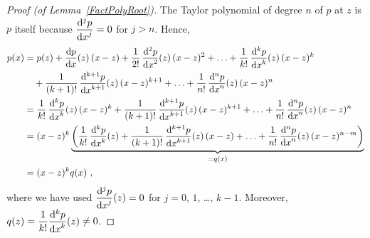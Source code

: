 \begin{proof}[Proof (of Lemma~\ref{FactPolyRoot})]
The Taylor polynomial of degree $n$ of $p$ at $z$ is $p$ itself
because $\DS \dydxn{p}{x}{j} = 0$ for $j>n$.  Hence,
\begin{align*}
p(x) &= p(z) + \dydx{p}{x}(z)\,(x-z) +
\frac{1}{2!}\,\dydxn{p}{x}{2}(z)\,(x-z)^2
+ \ldots + \frac{1}{k!}\,\dydxn{p}{x}{k}(z)\,(x-z)^k \\
&\quad + \frac{1}{(k+1)!}\,\dydxn{p}{x}{k+1}(z)\,(x-z)^{k+1}
+ \ldots + \frac{1}{n!}\,\dydxn{p}{x}{n}(z)\,(x-z)^n \\
&= \frac{1}{k!}\,\dydxn{p}{x}{k}(z)\,(x-z)^k
+ \frac{1}{(k+1)!}\,\dydxn{p}{x}{k+1}(z)\,(x-z)^{k+1}
+ \ldots + \frac{1}{n!}\,\dydxn{p}{x}{n}(z)\,(x-z)^n \\
&= (x-z)^k
\underbrace{\left( \frac{1}{k!}\,\dydxn{p}{x}{k}(z)
+ \frac{1}{(k+1)!}\,\dydxn{p}{x}{k+1}(z)\,(x-z)
+ \ldots + \frac{1}{n!}\,\dydxn{p}{x}{n}(z)\,(x-z)^{n-m}\right)}_{=q(x)} \\
&= (x-z)^k q(x) \ ,
\end{align*}
where we have used $\DS \dydxn{p}{x}{j}(z)=0$ for $j=0$,
$1$, \ldots, $k-1$.  Moreover,
$\DS q(z) = \frac{1}{k!} \dydxn{p}{x}{k}(z) \neq 0$.
\end{proof}

